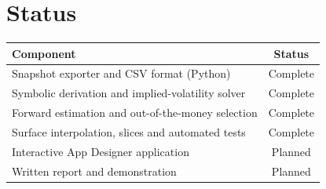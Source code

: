 \documentclass[11pt]{article}
\begin{document}
\section{Status}
\begin{table}[h]
\centering
\small
\begin{tabular}{@{}lc@{}}
\toprule
Component & Status \\
\midrule
Snapshot exporter and CSV format (Python) & Complete \\
Symbolic derivation and implied-volatility solver & Complete \\
Forward estimation and out-of-the-money selection & Complete \\
Surface interpolation, slices and automated tests & Complete \\
Interactive App Designer application & Planned \\
Written report and demonstration & Planned \\
\bottomrule
\end{tabular}
\end{table}
\end{document}
